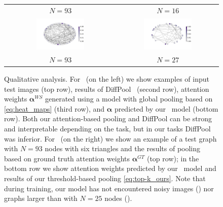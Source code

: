 \begin{figure}[tbh]
\begin{center}
\begin{minipage}{0.35\textwidth}
\begin{tabular}{cc}
			\tiny $N=93$ & \tiny $N=16$ \rule[-10pt]{0pt}{0pt} \\
			{\includegraphics[width=0.45\textwidth, align=c, trim={1cm 1cm 2cm 1.5cm}, clip]{cheb_weak_sup_triangles/triangles_test2_pred_large.png}} &
			{\includegraphics[width=0.5\textwidth, align=c, trim={2cm 1cm 0cm 1.5cm}, clip]{cheb_weak_sup_triangles/triangles_test2_pred_layer1_large.pdf}} \\
			\tiny $N=93$ & \tiny $N=27$ \\
		\end{tabular}
		\end{minipage}
	\end{center}
	\vspace{-10pt}
	\caption{\small Qualitative analysis. For \mnist~(on the left) we show examples of input test images (top row), results of DiffPool~\citep{ying2018hierarchical} (second row), attention weights $\mathbf{\alpha}^{WS}$ generated using a model with global pooling based on \eqref{eq:heat_maps} (third row), and $\mathbf{\alpha}$ predicted by our \wsup~model (bottom row). Both our attention-based pooling and DiffPool can be strong and interpretable depending on the task, but in our tasks DiffPool was inferior.
	For \tri~(on the right) we show an example of a test graph with $N=93$ nodes with six triangles and the results of pooling based on ground truth attention weights $\mathbf{\alpha}^{GT}$ (top row); in the bottom row we show attention weights predicted by our \wsup~model and results of our threshold-based pooling \eqref{eq:top-k_ours}. Note that during training, our model has not encountered noisy images (\mnist) nor graphs larger than with $N=25$ nodes (\tri). }
	\label{fig:attn_mnist}
	\vspace{-1pt}
\end{figure}

